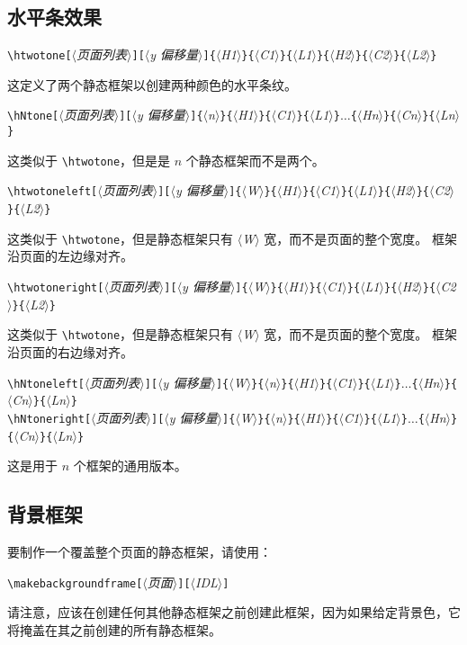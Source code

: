 \documentclass[a4paper]{book}%
\newcommand{\meta}[1]{\textnormal{\ensuremath{\langle}\makebox[0pt][l]{}\emph{#1}\makebox[0pt][l]{}\ensuremath{\rangle}}}
\begin{document}
\subsection{水平条效果}%
\begin{mdframed}
    \verb|\htwotone[|\meta{页面列表}\verb|][|\meta{y 偏移量}\verb|]{|\meta{H1}\verb|}{|\meta{C1}\verb|}{|\meta{L1}\verb|}{|\meta{H2}\verb|}{|\meta{C2}\verb|}{|\meta{L2}\verb|}|
\end{mdframed}
这定义了两个静态框架以创建两种颜色的水平条纹。
\begin{mdframed}
    \verb|\hNtone[|\meta{页面列表}\verb|][|\meta{y 偏移量}\verb|]{|\meta{n}\verb|}{|\meta{H1}\verb|}{|\meta{C1}\verb|}{|\meta{L1}\verb|}|$\ldots$\verb|{|\meta{Hn}\verb|}{|\meta{Cn}\verb|}{|\meta{Ln}\verb|}|
\end{mdframed}
这类似于 \verb|\htwotone|，但是是 $n$ 个静态框架而不是两个。
\begin{mdframed}
    \verb|\htwotoneleft[|\meta{页面列表}\verb|][|\meta{y 偏移量}\verb|]{|\meta{W}\verb|}{|\meta{H1}\verb|}{|\meta{C1}\verb|}{|\meta{L1}\verb|}{|\meta{H2}\verb|}{|\meta{C2}\verb|}{|\meta{L2}\verb|}|
\end{mdframed}
这类似于 \verb|\htwotone|，但是静态框架只有 \meta{W} 宽，而不是页面的整个宽度。 框架沿页面的左边缘对齐。
\begin{mdframed}
    \verb|\htwotoneright[|\meta{页面列表}\verb|][|\meta{y 偏移量}\verb|]{|\meta{W}\verb|}{|\meta{H1}\verb|}{|\meta{C1}\verb|}{|\meta{L1}\verb|}{|\meta{H2}\verb|}{|\meta{C2}\verb|}{|\meta{L2}\verb|}|
\end{mdframed}
这类似于 \verb|\htwotone|，但是静态框架只有 \meta{W} 宽，而不是页面的整个宽度。 框架沿页面的右边缘对齐。
\begin{mdframed}
    \verb|\hNtoneleft[|\meta{页面列表}\verb|][|\meta{y 偏移量}\verb|]{|\meta{W}\verb|}{|\meta{n}\verb|}{|\meta{H1}\verb|}{|\meta{C1}\verb|}{|\meta{L1}\verb|}|$\ldots$\verb|{|\meta{Hn}\verb|}{|\meta{Cn}\verb|}{|\meta{Ln}\verb|}|\\
    \verb|\hNtoneright[|\meta{页面列表}\verb|][|\meta{y 偏移量}\verb|]{|\meta{W}\verb|}{|\meta{n}\verb|}{|\meta{H1}\verb|}{|\meta{C1}\verb|}{|\meta{L1}\verb|}|$\ldots$\verb|{|\meta{Hn}\verb|}{|\meta{Cn}\verb|}{|\meta{Ln}\verb|}|
\end{mdframed}
这是用于 $n$ 个框架的通用版本。
\subsection{背景框架}%
要制作一个覆盖整个页面的静态框架，请使用：
\begin{mdframed}
    \verb|\makebackgroundframe[|\meta{页面}\verb|][|\meta{IDL}\verb|]|
\end{mdframed}
请注意，应该在创建任何其他静态框架之前创建此框架，因为如果给定背景色，它将掩盖在其之前创建的所有静态框架。
\end{document}
